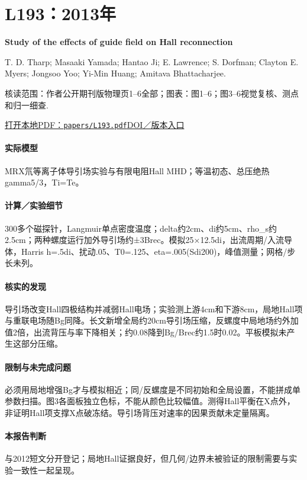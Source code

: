 \section{L193：2013年}\label{paper:L193}

\textbf{Study of the effects of guide field on Hall reconnection}\citep{L193}\

T. D. Tharp;  Masaaki Yamada;  Hantao Ji;  E. Lawrence;  S. Dorfman;  Clayton E. Myers;  Jongsoo Yoo;  Yi-Min Huang;  Amitava Bhattacharjee.

\textsf{核读范围：}作者公开期刊版物理页1–6全部；\textsf{图表：}图1–6；图3–6视觉复核、测点和归一细查.

\href{run:papers/L193.pdf}{打开本地PDF：\texttt{papers/L193.pdf}}\quad\href{https://doi.org/10.1063/1.4805244}{DOI／版本入口}

\paragraph{实际模型}MRX氘等离子体导引场实验与有限电阻Hall MHD；等温初态、总压绝热gamma5/3，Ti=Te。

\paragraph{计算／实验细节}300多个磁探针，Langmuir单点密度温度；delta约2cm、di约5cm、rho\_s约2.5cm；两种螺度运行加外导引场约±3Brec。模拟25×12.5di，出流周期/入流导体，Harris h=.5di、扰动.05、T0=.125、eta=.005(Sdi200)，峰值测量；网格/步长未列。

\paragraph{核实的发现}导引场改变Hall四极结构并减弱Hall电场；实验测上游4cm和下游8cm，局地Hall项与重联电场随Bg同降。长文新增全局约20cm导引场压缩，反螺度中局地场约外加值2倍，出流背压与率下降相关；约0.08降到Bg/Brec约1.5时0.02。平板模拟未产生这部分压缩。

\paragraph{限制与未完成问题}必须用局地增强Bg才与模拟相近；同/反螺度是不同初始和全局设置，不能拼成单参数扫描。图3各面板独立色标，不能从颜色比较幅值。测得Hall平衡在X点外，非证明Hall项支撑X点破冻结。导引场背压对速率的因果贡献未定量隔离。

\paragraph{本报告判断}与2012短文分开登记；局地Hall证据良好，但几何/边界未被验证的限制需要与实验一致性一起呈现。

